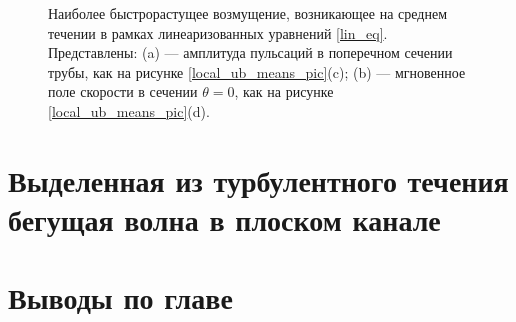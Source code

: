 \begin{figure}
\caption{Наиболее быстрорастущее возмущение, возникающее на среднем течении в рамках линеаризованных уравнений \eqref{lin_eq}. Представлены: (a) --- амплитуда пульсаций в поперечном сечении трубы, как на рисунке \ref{local_ub_means_pic}(c); (b) --- мгновенное поле скорости в сечении $\theta = 0$, как на рисунке \ref{local_ub_means_pic}(d). }
\label{ub_lin_pic}
\end{figure}

\section{Выделенная из турбулентного течения бегущая волна в плоском канале}

\section{Выводы по главе}


